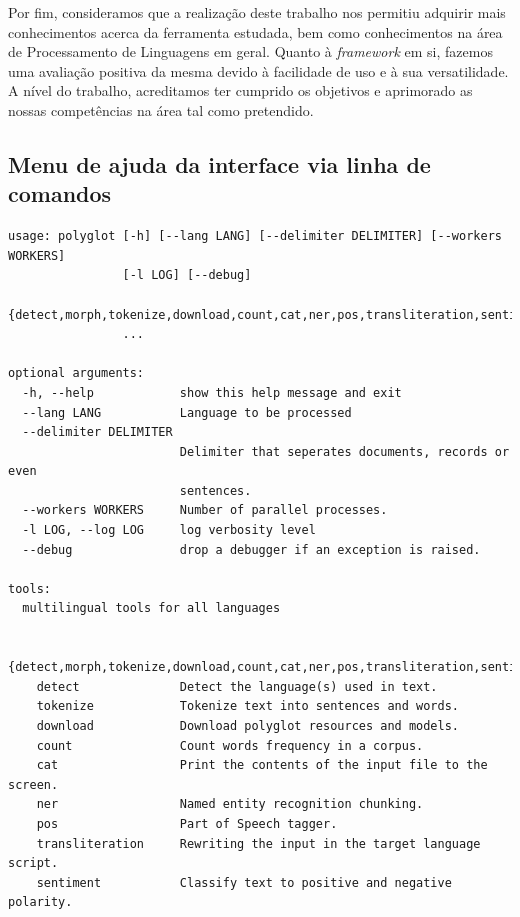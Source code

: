 \documentclass{article}
\begin{document}
Por fim, consideramos que a realização deste trabalho nos permitiu adquirir mais conhecimentos acerca da ferramenta estudada, bem como conhecimentos na área de Processamento de Linguagens em geral. Quanto à \textit{framework} em si, fazemos uma avaliação positiva da mesma devido à facilidade de uso e à sua versatilidade. A nível do trabalho, acreditamos ter cumprido os objetivos e aprimorado as nossas competências na área tal como pretendido.


\printbibliography
\newpage


\begin{appendices}

\section{Menu de ajuda da interface via linha de comandos} \label{helpCMD}
\begin{verbatim}
usage: polyglot [-h] [--lang LANG] [--delimiter DELIMITER] [--workers WORKERS]
                [-l LOG] [--debug]
                {detect,morph,tokenize,download,count,cat,ner,pos,transliteration,sentiment}
                ...

optional arguments:
  -h, --help            show this help message and exit
  --lang LANG           Language to be processed
  --delimiter DELIMITER
                        Delimiter that seperates documents, records or even
                        sentences.
  --workers WORKERS     Number of parallel processes.
  -l LOG, --log LOG     log verbosity level
  --debug               drop a debugger if an exception is raised.

tools:
  multilingual tools for all languages

  {detect,morph,tokenize,download,count,cat,ner,pos,transliteration,sentiment}
    detect              Detect the language(s) used in text.
    tokenize            Tokenize text into sentences and words.
    download            Download polyglot resources and models.
    count               Count words frequency in a corpus.
    cat                 Print the contents of the input file to the screen.
    ner                 Named entity recognition chunking.
    pos                 Part of Speech tagger.
    transliteration     Rewriting the input in the target language script.
    sentiment           Classify text to positive and negative polarity.
\end{verbatim}

\end{appendices}
\end{document}
